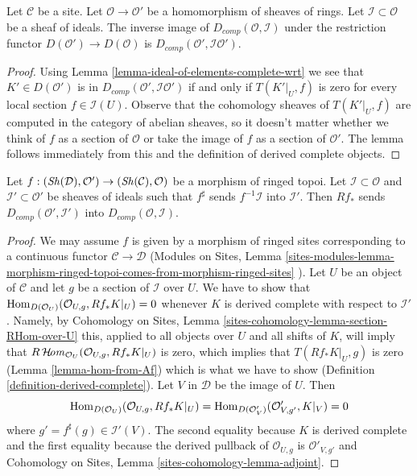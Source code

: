 \begin{lemma}
\label{lemma-restriction-derived-complete}
Let $\mathcal{C}$ be a site. Let $\mathcal{O} \to \mathcal{O}'$
be a homomorphism of sheaves of rings. Let $\mathcal{I} \subset \mathcal{O}$
be a sheaf of ideals. The inverse image of $D_{comp}(\mathcal{O}, \mathcal{I})$
under the restriction functor $D(\mathcal{O}') \to D(\mathcal{O})$ is
$D_{comp}(\mathcal{O}', \mathcal{I}\mathcal{O}')$.
\end{lemma}

\begin{proof}
Using Lemma \ref{lemma-ideal-of-elements-complete-wrt}
we see that $K' \in D(\mathcal{O}')$ is in
$D_{comp}(\mathcal{O}', \mathcal{I}\mathcal{O}')$
if and only if $T(K'|_U, f)$ is zero for every local section
$f \in \mathcal{I}(U)$. Observe that the cohomology sheaves of
$T(K'|_U, f)$ are computed in the category of abelian sheaves,
so it doesn't matter whether we think of $f$ as a section of
$\mathcal{O}$ or take the image of $f$ as a section of $\mathcal{O}'$.
The lemma follows immediately from this and the
definition of derived complete objects.
\end{proof}

\begin{lemma}
\label{lemma-pushforward-derived-complete}
Let $f : (\mathop{\mathit{Sh}}\nolimits(\mathcal{D}), \mathcal{O}') \to (\mathop{\mathit{Sh}}\nolimits(\mathcal{C}), \mathcal{O})$
be a morphism of ringed topoi. Let $\mathcal{I} \subset \mathcal{O}$
and $\mathcal{I}' \subset \mathcal{O}'$ be sheaves of ideals such
that $f^\sharp$ sends $f^{-1}\mathcal{I}$ into $\mathcal{I}'$.
Then $Rf_*$ sends $D_{comp}(\mathcal{O}', \mathcal{I}')$
into $D_{comp}(\mathcal{O}, \mathcal{I})$.
\end{lemma}

\begin{proof}
We may assume $f$ is given by a morphism of ringed sites corresponding
to a continuous functor $\mathcal{C} \to \mathcal{D}$
(Modules on Sites, Lemma
\ref{sites-modules-lemma-morphism-ringed-topoi-comes-from-morphism-ringed-sites}
).
Let $U$ be an object of $\mathcal{C}$ and let $g$ be a section of
$\mathcal{I}$ over $U$. We have to show that
$\mathop{\mathrm{Hom}}\nolimits_{D(\mathcal{O}_U)}(\mathcal{O}_{U, g}, Rf_*K|_U) = 0$
whenever $K$ is derived complete with respect to $\mathcal{I}'$.
Namely, by Cohomology on Sites, Lemma
\ref{sites-cohomology-lemma-section-RHom-over-U}
this, applied to all objects over $U$ and all shifts of $K$,
will imply that $R\mathop{\mathcal{H}\!\mathit{om}}\nolimits_{\mathcal{O}_U}(\mathcal{O}_{U, g}, Rf_*K|_U)$
is zero, which implies that $T(Rf_*K|_U, g)$ is zero
(Lemma \ref{lemma-hom-from-Af}) which is what we have to show
(Definition \ref{definition-derived-complete}).
Let $V$ in $\mathcal{D}$ be the image of $U$. Then
$$
\mathop{\mathrm{Hom}}\nolimits_{D(\mathcal{O}_U)}(\mathcal{O}_{U, g}, Rf_*K|_U) =
\mathop{\mathrm{Hom}}\nolimits_{D(\mathcal{O}'_V)}(\mathcal{O}'_{V, g'}, K|_V) = 0
$$
where $g' = f^\sharp(g) \in \mathcal{I}'(V)$. The second equality
because $K$ is derived complete and the first equality because
the derived pullback of $\mathcal{O}_{U, g}$ is $\mathcal{O}'_{V, g'}$
and
Cohomology on Sites, Lemma \ref{sites-cohomology-lemma-adjoint}.
\end{proof}

